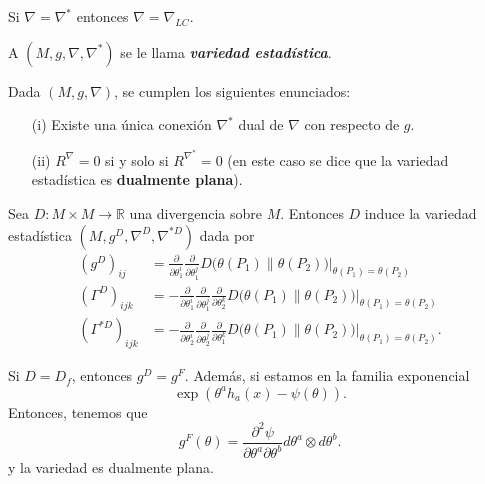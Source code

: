 \begin{observation}
Si $\nabla=\nabla^*$ entonces $\nabla=\nabla_{LC}$.    
\end{observation}

\begin{definition}
A $(M,g,\nabla,\nabla^*)$ se le llama \textit{\textbf{variedad estad\'istica}}.    
\end{definition}

\begin{theorem}\cite{nielsen2020elementary}
Dada $(M,g,\nabla)$, se cumplen los siguientes enunciados:
\begin{enumerate}
    \item[(i)] Existe una \'unica conexi\'on $\nabla^*$ dual de $\nabla$ con respecto de $g$.
    \item[(ii)] $R^\nabla=0$ si y solo si $R^{\nabla^*}=0$ (en este caso se dice que la variedad estad\'istica es \textbf{dualmente plana}).
\end{enumerate}
\end{theorem}

\begin{theorem}
Sea $D\colon M\times M\to\mathbb{R}$ una divergencia sobre $M$. Entonces $D$ induce la variedad estad\'istica $(M,g^D,\nabla^D,\nabla^{*D})$ dada por
\begin{align*}
    (g^D)_{ij}&=\frac{\partial}{\partial\theta_1^i}\frac{\partial}{\partial\theta_1^j}D\bigl(\theta(P_1)\|\theta(P_2)\bigl)\Big|_{\theta(P_1)=\theta(P_2)}\\
    (\Gamma^D)_{ijk}&=-\frac{\partial}{\partial\theta_1^i}\frac{\partial}{\partial\theta_1^j}\frac{\partial}{\partial\theta_2^k}D\bigl(\theta(P_1)\|\theta(P_2)\bigl)\Big|_{\theta(P_1)=\theta(P_2)}\\
    (\Gamma^{*D})_{ijk}&=-\frac{\partial}{\partial\theta_2^i}\frac{\partial}{\partial\theta_2^j}\frac{\partial}{\partial\theta_1^k}D\bigl(\theta(P_1)\|\theta(P_2)\bigl)\Big|_{\theta(P_1)=\theta(P_2)}.
\end{align*}
\end{theorem}

\begin{observation}
Si $D=D_f$, entonces $g^D=g^F$. Adem\'as, si estamos en la familia exponencial
\begin{equation*}
    \exp(\theta^ah_a(x)-\psi(\theta)).
\end{equation*}
Entonces, tenemos que 
\begin{equation*}
    g^F(\theta)=\frac{\partial^2\psi}{\partial\theta^a\partial\theta^b}d\theta^a\otimes d\theta^b.
\end{equation*}
y la variedad es dualmente plana.
\end{observation}

